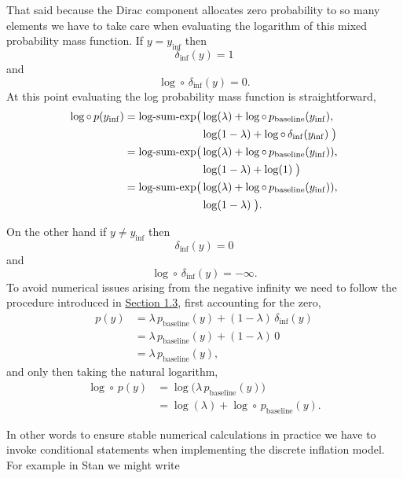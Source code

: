 \documentclass[
  letterpaper,
  DIV=11,
  numbers=noendperiod]{scrartcl}
\begin{document}
That said because the Dirac component allocates zero probability to so
many elements we have to take care when evaluating the logarithm of this
mixed probability mass function. If \(y = y_{\mathrm{inf}}\) then \[
\delta_{\mathrm{inf}}(y) = 1
\] and \[
\log \circ \, \delta_{\mathrm{inf}}(y) = 0.
\] At this point evaluating the log probability mass function is
straightforward, \begin{align*}
\log \circ \, p(y_{\mathrm{inf}})
&=
\text{log-sum-exp}\big(
\log(\lambda) + \log \circ \, p_{\mathrm{baseline}}(y_{\mathrm{inf}}),
\\
&
\hphantom{=\text{log-sum-exp}\big(\;}
\log(1 - \lambda) + \log \circ \, \delta_{\mathrm{inf}}(y_{\mathrm{inf}}) \; \big)
\\
&=
\text{log-sum-exp}\big(
\log(\lambda) + \log \circ \, p_{\mathrm{baseline}}(y_{\mathrm{inf}}) ),
\\
&
\hphantom{=\text{log-sum-exp}\big(\;}
 \log(1 - \lambda)  + \log(1) \; \big)
\\
&=
\text{log-sum-exp}\big(
\log(\lambda) + \log \circ \, p_{\mathrm{baseline}}(y_{\mathrm{inf}}) ),
\\
&
\hphantom{=\text{log-sum-exp}\big(\;}
\log(1 - \lambda) \; \big).
\end{align*}

On the other hand if \(y \ne y_{\mathrm{inf}}\) then \[
\delta_{\mathrm{inf}}(y) = 0
\] and \[
\log \circ \, \delta_{\mathrm{inf}}(y) = -\infty.
\] To avoid numerical issues arising from the negative infinity we need
to follow the procedure introduced in \hyperref[sec:stable_impl]{Section
1.3}, first accounting for the zero, \begin{align*}
p(y)
&=
  \lambda \, p_{\mathrm{baseline}}(y)
+ (1 - \lambda) \, \delta_{\mathrm{inf}}(y)
\\
&=
\lambda \, p_{\mathrm{baseline}}(y) + (1 - \lambda) \, 0
\\
&=
\lambda \, p_{\mathrm{baseline}}(y),
\end{align*} and only then taking the natural logarithm, \begin{align*}
\log \circ \, p(y)
&=
\log \big( \lambda \, p_{\mathrm{baseline}}(y) \big)
\\
&=
\log (\lambda) + \log \circ \, p_{\mathrm{baseline}}(y).
\end{align*}

In other words to ensure stable numerical calculations in practice we
have to invoke conditional statements when implementing the discrete
inflation model. For example in Stan we might write
\end{document}
